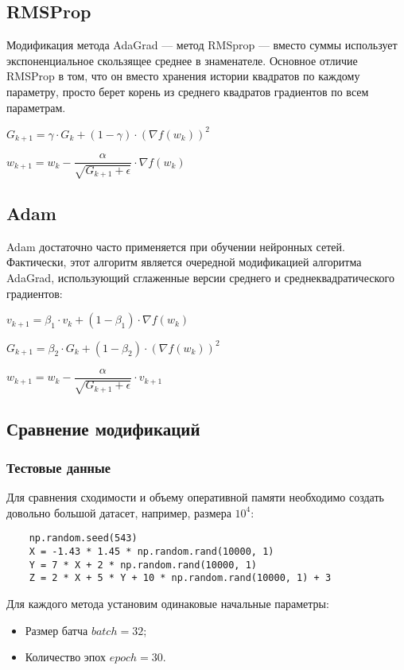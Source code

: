 \documentclass{article}
\begin{document}
\subsection*{RMSProp}
Модификация метода AdaGrad — метод RMSprop — вместо суммы использует экспоненциальное скользящее среднее в знаменателе. Основное отличие RMSProp в том, что он вместо хранения истории квадратов по каждому параметру, просто берет корень из среднего квадратов градиентов по всем параметрам.
\begin{center}
    $G_{k+1} = \gamma \cdot G_k + (1 - \gamma) \cdot (\nabla f(w_k))^2$
\end{center}
\begin{center}
    $w_{k+1} = w_k - \dfrac{\alpha}{\sqrt{G_{k+1} + \epsilon}} \cdot \nabla f(w_k)$
\end{center}
\subsection*{Adam}
Adam достаточно часто применяется при обучении нейронных сетей. Фактически, этот алгоритм является очередной модификацией алгоритма AdaGrad, использующий сглаженные версии среднего и среднеквадратического градиентов:
\begin{center}
    $v_{k+1} = \beta_1 \cdot v_k + (1 - \beta_1) \cdot \nabla f(w_k)$
\end{center}
\begin{center}
    $G_{k+1} = \beta_2 \cdot G_k + (1 - \beta_2) \cdot (\nabla f(w_k))^2$
\end{center}
\begin{center}
    $w_{k+1} = w_k - \dfrac{\alpha}{\sqrt{G_{k+1} + \epsilon}} \cdot v_{k+1}$
\end{center}

\subsection*{Сравнение модификаций}
\subsubsection*{Тестовые данные}
Для сравнения сходимости и объему оперативной памяти необходимо создать довольно большой датасет, например, размера $10^{4}$:
\begin{verbatim}
    np.random.seed(543)
    X = -1.43 * 1.45 * np.random.rand(10000, 1)
    Y = 7 * X + 2 * np.random.rand(10000, 1)
    Z = 2 * X + 5 * Y + 10 * np.random.rand(10000, 1) + 3
\end{verbatim}
Для каждого метода установим одинаковые начальные параметры:
\begin{itemize}
    \item Размер батча $batch = 32$;
    \item Количество эпох $epoch = 30$.
\end{itemize}
\end{document}
